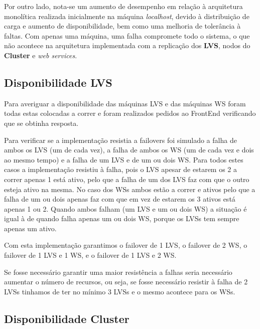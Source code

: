 \hspace{5mm} Por outro lado, nota-se um aumento de desempenho em relação à arquitetura monolítica realizada inicialmente na máquina \emph{localhost}, devido à distribuição de carga e aumento de disponibilidade, bem como uma melhoria de tolerância à faltas. Com apenas uma máquina, uma falha compromete todo o sistema, o que não acontece na arquitetura implementada com a replicação dos \textbf{LVS}, nodos do \textbf{Cluster} e \emph{web services}.

\subsection{Disponibilidade LVS} \label{subsec:dispLVS}

\hspace{5mm} Para averiguar a disponibilidade das máquinas LVS e das máquinas WS foram todas estas colocadas a correr e foram realizados pedidos ao FrontEnd verificando que se obtinha resposta.

\hspace{5mm} Para verificar se a implementação resistia a failovers foi simulado a falha de ambos os LVS (um de cada vez), a falha de ambos os WS (um de cada vez e dois ao mesmo tempo) e a falha de um LVS e de um ou dois WS. Para todos estes casos a implementação resistiu à falha, pois o LVS apesar de estarem os 2 a correr apenas 1 está ativo, pelo que a falha de um dos LVS faz com que o outro esteja ativo na mesma. No caso dos WSs ambos estão a correr e ativos pelo que a falha de um ou dois apenas faz com que em vez de estarem os 3 ativos está apenas 1 ou 2. Quando ambos falham (um LVS e um ou dois WS) a situação é igual à de quando falha apenas um  ou dois WS, porque os LVSs tem sempre apenas um ativo.

\hspace{5mm} Com esta implementação garantimos o failover de 1 LVS, o failover de 2 WS, o failover de 1 LVS e 1 WS, e o failover de 1 LVS e 2 WS.

\hspace{5mm} Se fosse necessário garantir uma maior resistência a falhas seria necessário aumentar o número de recursos, ou seja, se fosse necessário resistir à falha de 2 LVSs tinhamos de ter no mínimo 3 LVSs e o mesmo acontece para os WSs.

\subsection{Disponibilidade Cluster} \label{subsec:dispClus}

